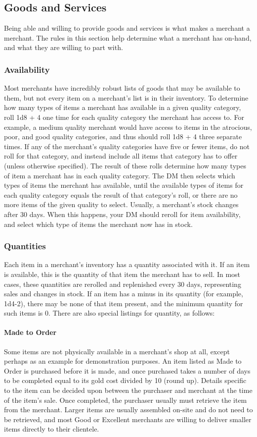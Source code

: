 \documentclass[10pt,a4paper,twoside,twocolumn,openany,nodeprecatedcode,bg=print]{dndbook}
\begin{document}
\subsection{Goods and Services}
Being able and willing to provide goods and services is what makes a merchant a merchant. The rules in this section help determine what a merchant has on-hand, and what they are willing to part with.
\subsubsection{Availability}
Most merchants have incredibly robust lists of goods that may be available to them, but not every item on a merchant's list is in their inventory.
To determine how many types of items a merchant has available in a given quality category, roll 1d8 + 4 one time for each quality category the merchant has access to. For example, a medium quality merchant would have access to items in the atrocious, poor, and good quality categories, and thus should roll 1d8 + 4 three separate times. If any of the merchant's quality categories have five or fewer items, do not roll for that category, and instead include all items that category has to offer (unless otherwise specified).
The result of these rolls determine how many types of item a merchant has in each quality category. The DM then selects which types of items the merchant has available, until the available types of items for each quality category equals the result of that category's roll, or there are no more items of the given quality to select.
Usually, a merchant's stock changes after 30 days. When this happens, your DM should reroll for item availability, and select which type of items the merchant now has in stock.
\subsubsection{Quantities}
Each item in a merchant's inventory has a quantity associated with it. If an item is available, this is the quantity of that item the merchant has to sell. In most cases, these quantities are rerolled and replenished every 30 days, representing sales and changes in stock. If an item has a minus in its quantity (for example, 1d4-2), there may be none of that item present, and the minimum quantity for such items is 0.
There are also special listings for quantity, as follows:
\paragraph{Made to Order}
Some items are not physically available in a merchant's shop at all, except perhaps as an example for demonstration purposes. An item listed as Made to Order is purchased before it is made, and once purchased takes a number of days to be completed equal to its gold cost divided by 10 (round up). Details specific to the item can be decided upon between the purchaser and merchant at the time of the item's sale.
Once completed, the purchaser usually must retrieve the item from the merchant. Larger items are usually assembled on-site and do not need to be retrieved, and most Good or Excellent merchants are willing to deliver smaller items directly to their clientele.
\end{document}
